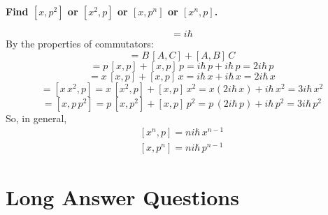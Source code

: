 \documentclass[12pt,a4paper,answers]{exam}
\begin{document}
\begin{questions}
	\question		\textbf{Find $ [x, p^2]$ or $[x^2 , p]$ or $[x, p^n ]$ or $[x^n , p]$.}
	\begin{solutionorbox}
		\begin{equation}
		[x,p] = i\hbar
		\end{equation}
		By the properties of commutators:
		\begin{equation}
		[A,BC] = B\,[A,C] + [A,B]\,C
		\end{equation}
		\begin{dmath*}
			[x,p^2] = p\, [x,p] + [x,p]\, p = i\hbar\, p + i \hbar\, p = 2i\hbar\, p
		\end{dmath*}
		\begin{dmath*}
			[x^2,p] = x\, [x,p] + [x,p]\, x = i\hbar\, x + i \hbar\, x = 2i\hbar\, x
		\end{dmath*}
		\begin{dmath*}
			[x^3,p] = [x\,x^2 , p]
			= x\, [x^2,p] + [x,p]\, x^2 
			= x(2 i\hbar\, x) + i \hbar\, x^2 
			= 3i\hbar\, x^2
		\end{dmath*}
		\begin{dmath*}
			[x,p^3] = [x , p\,p^2]
			= p\, [x,p^2] + [x,p]\, p^2 
			= p\, (2 i\hbar\, p) + i \hbar\, p^2 
			= 3i\hbar\, p^2
		\end{dmath*}
		So, in general,
		\begin{eqnarray}
			\boxed{[x^n,p] = ni\hbar\, x^{n-1}}\\
			\boxed{[x,p^n] = ni\hbar\, p^{n-1}}
		\end{eqnarray}
	\end{solutionorbox}
\end{questions}

\newpage
\section*{Long Answer Questions}
\end{document}
